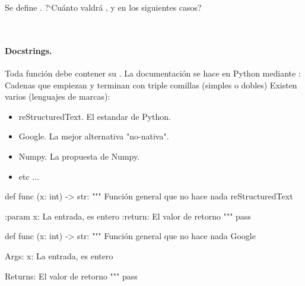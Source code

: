 \begin{ejercicio}
Se define . ?`Cuánto valdrá ,  y  en los siguientes casos?

\begin{itemize*}
\item {}
\item {}
\item {} \\
\item {}
\item {}
\item {}
\end{itemize*}
\end{ejercicio}



\paragraph{Docstrings.}

Toda función debe contener su .
La documentación se hace en Python mediante : Cadenas que empiezan y terminan con triple comillas (simples o dobles)
Existen varios  (lenguajes de marcas):
\begin{itemize}
\item reStructuredText. El estandar de Python.
\item Google. La mejor alternativa "no-nativa".
\item Numpy. La propuesta de Numpy.
\item etc ...
\end{itemize}


\hfil\begin{minipage}{.4\textwidth}
\begin{pyverbatim}[][frame=single, fontsize=\footnotesize]
def func (x: int) -> str:
    """
    Función general que no hace nada
    reStructuredText
    
    :param x: La entrada, es entero
    :return: El valor de retorno
    """
    pass
\end{pyverbatim}
\end{minipage}
\begin{minipage}{.4\textwidth}
\begin{pyverbatim}[][frame=single, fontsize=\footnotesize]
def func (x: int) -> str:
    """
    Función general que no hace nada
    Google
    
    Args:
        x: La entrada, es entero

    Returns:
        El valor de retorno
    """
    pass
\end{pyverbatim}
\end{minipage}







